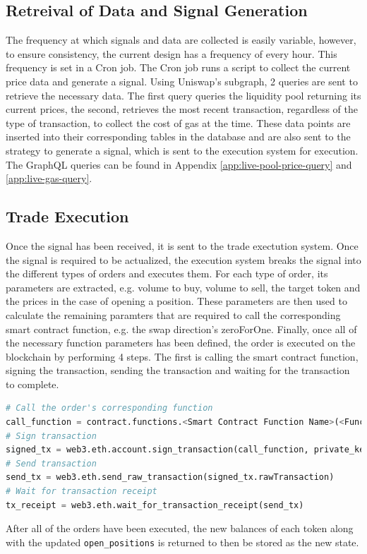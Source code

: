 \subsection{Retreival of Data and Signal Generation}
The frequency at which signals and data are collected is easily variable, however, to ensure consistency, the current design has a frequency of every hour. This frequency is set in a Cron job. The Cron job runs a script to collect the current price data and generate a signal. Using Uniswap's subgraph, 2 queries are sent to retrieve the necessary data. The first query queries the liquidity pool returning its current prices, the second, retrieves the most recent transaction, regardless of the type of transaction, to collect the cost of gas at the time. These data points are inserted into their corresponding tables in the database and are also sent to the strategy to generate a signal, which is sent to the execution system for execution. The GraphQL queries can be found in Appendix \ref{app:live-pool-price-query} and \ref{app:live-gas-query}.

\subsection{Trade Execution}
Once the signal has been received, it is sent to the trade exectution system. Once the signal is required to be actualized, the execution system breaks the signal into the different types of orders and executes them. For each type of order, its parameters are extracted, e.g. volume to buy, volume to sell, the target token and the prices in the case of opening a position. These parameters are then used to calculate the remaining paramters that are required to call the corresponding smart contract function, e.g. the swap direction's zeroForOne. Finally, once all of the necessary function parameters has been defined, the order is executed on the blockchain by performing 4 steps. The first is calling the smart contract function, signing the transaction, sending the transaction and waiting for the transaction to complete.
\begin{lstlisting}[language=Python]
# Call the order's corresponding function
call_function = contract.functions.<Smart Contract Function Name>(<Function Paramters>).buildTransaction({"chainId": Chain_id, "from": caller, "nonce": nonce})
# Sign transaction
signed_tx = web3.eth.account.sign_transaction(call_function, private_key=private_key)
# Send transaction
send_tx = web3.eth.send_raw_transaction(signed_tx.rawTransaction)
# Wait for transaction receipt
tx_receipt = web3.eth.wait_for_transaction_receipt(send_tx)
\end{lstlisting}

\noindent After all of the orders have been executed, the new balances of each token along with the updated \texttt{open\_positions} is returned to then be stored as the new state.


